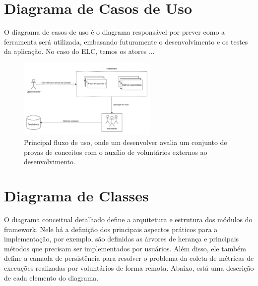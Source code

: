 \documentclass[12pt]{tcc}
\begin{document}
\begin{lstlisting}[label={lst:sheetson_class}, caption={Implementação da classe responsável pela persistência dos dados usando o Sheetson.}, language=TypeScript, breaklines=true]

\end{lstlisting}





\section{Diagrama de Casos de Uso}
\label{sec:diagrama_de_caso_de_uso}

O diagrama de casos de uso é o diagrama responsável por prever como a ferramenta será utilizada, embasando futuramente o desenvolvimento e os testes da aplicação. No caso do ELC, temos os atores ...

\begin{figure}[!ht]
	\centering
	\includegraphics[width=0.6\textwidth]{figures/diagrama-informal.pdf}
	\caption{Principal fluxo de uso, onde um desenvolver avalia um conjunto de provas de conceitos com o auxílio de voluntários externos ao desenvolvimento.}
	\label{fig:diagrama-informal}
\end{figure}

	
\section{Diagrama de Classes}
\label{cap:diagrama_de_classe}


O diagrama conceitual detalhado define a arquitetura e estrutura dos módulos do framework.
Nele há a definição dos principais aspectos práticos para a implementação, por exemplo, são definidas as árvores de herança e principais métodos que precisam ser implementados por usuários.
Além disso, ele também define a camada de persistência para resolver o problema da coleta de métricas de execuções realizadas por voluntários de forma remota.
Abaixo, está uma descrição de cada elemento do diagrama.
\end{document}
